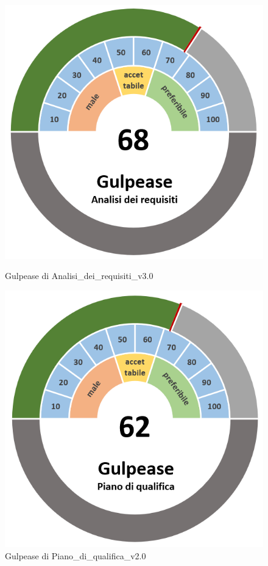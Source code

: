 \begin{figure}[H]
    \centering
    \begin{minipage}[b]{0.45\textwidth}
        \centering
        \includegraphics[width=\textwidth]{GulpeaseAdr.png}
        \caption{Gulpease di Analisi\_dei\_requisiti\_v3.0}
    \end{minipage}
    \hfill
    \begin{minipage}[b]{0.45\textwidth}
        \centering
        \includegraphics[width=\textwidth]{GulpeasePdq.png}
        \caption{Gulpease di Piano\_di\_qualifica\_v2.0}
    \end{minipage}
\end{figure}
